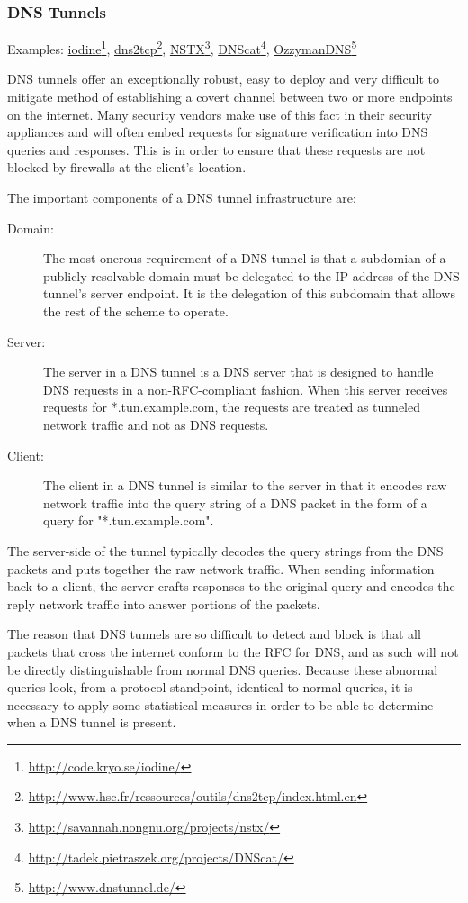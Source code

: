 \documentclass{article}
\newcommand{\hreff}[2]{\href{#1}{#2}\footnote{\url{#1}}}
\theoremstyle{remark}
\theoremstyle{definition}
\theoremstyle{definition}
\theoremstyle{definition}
\begin{document}
\subsubsection{DNS Tunnels}
\label{dns-tunnels}
Examples: \hreff{http://code.kryo.se/iodine/}{iodine}, \hreff{http://www.hsc.fr/ressources/outils/dns2tcp/index.html.en}{dns2tcp}, \hreff{http://savannah.nongnu.org/projects/nstx/}{NSTX}, \hreff{http://tadek.pietraszek.org/projects/DNScat/}{DNScat}, \hreff{http://www.dnstunnel.de/}{OzzymanDNS}

DNS tunnels offer an exceptionally robust, easy to deploy and very difficult to mitigate method of establishing a covert channel between two or more endpoints on the internet. Many security vendors make use of this fact in their security appliances and will often embed requests for signature verification into DNS queries and responses. This is in order to ensure that these requests are not blocked by firewalls at the client's location.

The important components of a DNS tunnel infrastructure are:

\begin{description}
\item[Domain:] The most onerous requirement of a DNS tunnel is that a subdomian of a publicly resolvable domain must be delegated to the IP address of the DNS tunnel's server endpoint. It is the delegation of this subdomain that allows the rest of the scheme to operate.
\item[Server:] The server in a DNS tunnel is a DNS server that is designed to handle DNS requests in a non-RFC-compliant fashion. When this server receives requests for *.tun.example.com, the requests are treated as tunneled network traffic and not as DNS requests.
\item[Client:] The client in a DNS tunnel is similar to the server in that it encodes raw network traffic into the query string of a DNS packet in the form of a query for "*.tun.example.com".
\end{description}

The server-side of the tunnel typically decodes the query strings from the DNS packets and puts together the raw network traffic. When sending information back to a client, the server crafts responses to the original query and encodes the reply network traffic into answer portions of the packets.

The reason that DNS tunnels are so difficult to detect and block is that all packets that cross the internet conform to the RFC for DNS, and as such will not be directly distinguishable from normal DNS queries. Because these abnormal queries look, from a protocol standpoint, identical to normal queries, it is necessary to apply some statistical measures in order to be able to determine when a DNS tunnel is present.
\end{document}
